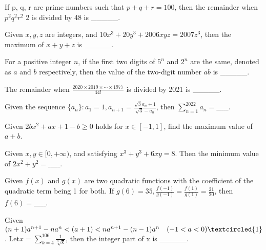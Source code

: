 \begin{problem}\label{Alg48}
If p, q, r are prime numbers such that $p+q+r=100$, then the remainder when $p^{2} q^{2} r^{2}$ 2 is divided by 48 is \_\_\_\_\_.
\end{problem}


\begin{problem}\label{Alg49}
Given $x, y, z$ are integers, and $10x^{3}+20y^{3}+2006 xyz=2007z^{3}$, then the maximum of $x+y+z$ is \_\_\_\_\_.
\end{problem}



\begin{problem}\label{Alg50}
For a positive integer $n$, if the first two digits of  $5^{n}$ and $2^{n}$ are the same, denoted as $a$ and $b $ respectively, then the value of the two-digit number $ \overline{ab}$ is \_\_\_\_\_.
\end{problem}


\begin{problem}\label{Number_Theory51}
The remainder when $\frac{2020 \times 2019 \times \cdots \times 1977}{44!}$ is divided by 2021 is \_\_\_\_\_.
\end{problem}



\begin{problem}\label{AI-Algebra1}
Given the sequence $\{a_n\}: a_1=1, a_{n+1}=\frac{\sqrt{3}a_n+1}{\sqrt{3}-a_n}$, then 
$\sum\limits_{n=1}^{2022}a_n=\_\_\_\_\_$.
\end{problem}


\begin{problem}\label{AI-Algebra3}
Given \(2bx^2 + ax + 1 - b \geq 0\) holds for \(x \in [-1, 1]\), find the maximum value of \(a + b\).
\end{problem}


\begin{problem}\label{AI-Algebra4}
Given $x,y \in [0,+\infty)$, and satisfying $x^3+y^3+6xy=8$. Then the minimum value of $2x^2+y^2=\_\_\_\_\_$.
\end{problem}

\begin{problem}\label{AI-Algebra5}
Given $f(x)$ and $g(x)$ are two quadratic functions with the coefficient of the quadratic term being 1 for both. If $g(6)=35,\frac{f(-1)}{g(-1)}=\frac{f(1)}{g(1)}=\frac{21}{20}$, then $f(6)=\_\_\_\_\_$.
\end{problem}


\begin{problem}\label{AI-Algebra6}
Given $(n + 1)a^{n+1} - n a^n < (a + 1) < n a^{n+1} - (n - 1)a^n\quad (-1 < a < 0)
 \textcircled{1}$. Let$x=\sum\limits_{k=4}^{106}\frac{1}{\sqrt[3]{k}}$, then the integer part of x is \_\_\_\_\_.
\end{problem}


